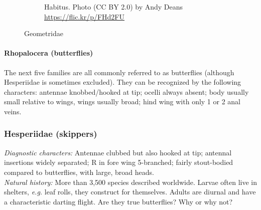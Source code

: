 \documentclass[letterpaper, 11pt]{article}
\begin{document}
\begin{figure}[ht!]
\begin{subfigure}[ht!]{0.48\textwidth}
        \caption{Habitus. Photo (CC BY 2.0) by Andy Deans \url{https://flic.kr/p/FHd2FU}}
        \label{fig:geometrid2}
    \end{subfigure}
    \caption{Geometridae}\label{fig:geometrids}
\end{figure}

\paragraph{Rhopalocera (butterflies)} The next five families are all commonly referred to as butterflies (although Hesperiidae is sometimes excluded). They can be recognized by the following characters: antennae knobbed/hooked at tip; ocelli always absent; body usually small relative to wings, wings usually broad; hind wing with only 1 or 2 anal veins.

\subsubsection{Hesperiidae (skippers)}
\noindent{}\textit{Diagnostic characters:} Antennae clubbed but also hooked at tip; antennal insertions widely separated; R in fore wing 5-branched; fairly stout-bodied compared to butterflies, with large, broad heads.\\

\noindent{}\textit{Natural history:} More than 3,500 species described worldwide. Larvae often live in shelters, \textit{e.g.} leaf rolls, they construct for themselves. Adults are diurnal and have a characteristic darting flight. Are they true butterflies? Why or why not?
\end{document}
